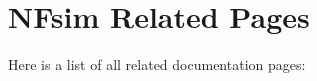 \section{NFsim Related Pages}
Here is a list of all related documentation pages:\begin{CompactList}
\item {}

\end{CompactList}
